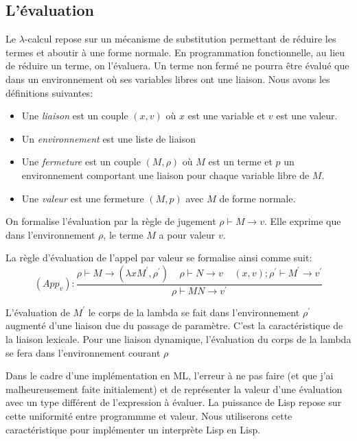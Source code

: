 \documentclass[11pt]{book}
\begin{document}
\subsection{L'évaluation}
Le $\lambda$-calcul repose sur un mécanisme de substitution permettant de réduire les termes et
aboutir à une forme normale. En programmation fonctionnelle, au lieu de réduire un terme, on
l'évaluera. Un terme non fermé ne pourra être évalué que dans un environnement où ses 
variables libres ont une liaison. Nous avons les définitions suivantes:
\begin{itemize}
	\item Une \textit{liaison} est un couple $(x,v)$ où $x$ est une variable et $v$ est une valeur.
	\item Un \textit{environnement} est une liste de liaison
	\item Une \textit{fermeture} est un couple $(M,\rho)$ où $M$ est un terme et $p$ un environnement 
	comportant une liaison pour chaque variable libre de $M$.
	\item Une \textit{valeur} est une fermeture $(M,p)$ avec $M$ de forme normale.
\end{itemize}
On formalise l'évaluation par la règle de jugement $\rho \vdash M \rightarrow v$. Elle exprime
que dans l'environnement $\rho$, le terme $M$ a pour valeur $v$.

La règle d'évaluation de l'appel par valeur se formalise ainsi comme suit:
\[(App_v): \frac{\rho \vdash M \rightarrow (\lambda x M^{'} , \rho ^{'} )  
		\ \ \ \ \ \rho \vdash N \rightarrow v \ \ \ \ \ (x,v);\rho ^{'} \vdash M^{'} \rightarrow v^{'} }
		 { \rho \vdash M N \rightarrow v^{'} }
\]

L'évaluation de $M^{'}$ le corps de la lambda se fait dans l'environnement $\rho ^{'}$ augmenté 
d'une liaison due du passage de paramètre. C'est la caractéristique de la liaison lexicale.
Pour  une liaison dynamique, l'évaluation du corps de la lambda se fera  dans l'environnement
courant $\rho$

Dans le cadre d'une implémentation en ML, l'erreur à ne pas faire (et que j'ai malheureusement faite initialement) et de
représenter la valeur d'une évaluation avec un type différent de l'expression à évaluer.
La puissance de Lisp repose sur  cette uniformité entre programmme et valeur. Nous utiliserons cette caractéristique pour
implémenter un interprète Lisp en Lisp.
\end{document}
